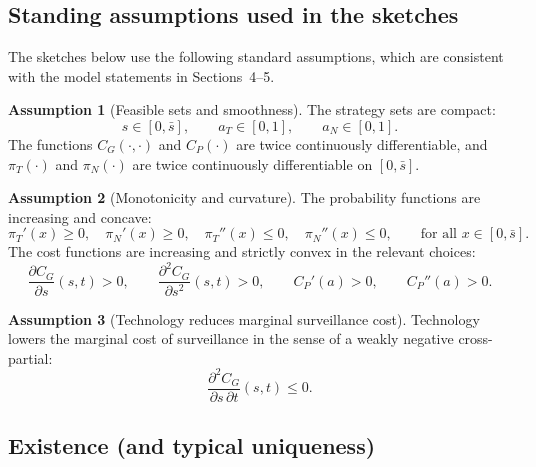 \documentclass[11pt,a4paper]{article}
\theoremstyle{definition}
\theoremstyle{remark}
\theoremstyle{definition}
\newtheorem{assumption}{Assumption}
\begin{document}
\subsection{Standing assumptions used in the sketches}

The sketches below use the following standard assumptions, which are consistent with the model statements in Sections~4--5.

\begin{assumption}[Feasible sets and smoothness]
The strategy sets are compact:
$$
s \in [0,\bar s],
\qquad
a_T \in [0,1],
\qquad
a_N \in [0,1].
$$
The functions $C_G(\cdot,\cdot)$ and $C_P(\cdot)$ are twice continuously differentiable, and $\pi_T(\cdot)$ and $\pi_N(\cdot)$ are twice continuously differentiable on $[0,\bar s]$.
\end{assumption}

\begin{assumption}[Monotonicity and curvature]
The probability functions are increasing and concave:
$$
\pi_T'(x) \ge 0,
\quad
\pi_N'(x) \ge 0,
\quad
\pi_T''(x) \le 0,
\quad
\pi_N''(x) \le 0,
\qquad
\text{for all } x \in [0,\bar s].
$$
The cost functions are increasing and strictly convex in the relevant choices:
$$
\frac{\partial C_G}{\partial s}(s,t) > 0,
\qquad
\frac{\partial^2 C_G}{\partial s^2}(s,t) > 0,
\qquad
C_P'(a) > 0,
\qquad
C_P''(a) > 0.
$$
\end{assumption}

\begin{assumption}[Technology reduces marginal surveillance cost]
Technology lowers the marginal cost of surveillance in the sense of a weakly negative cross-partial:
$$
\frac{\partial^2 C_G}{\partial s\,\partial t}(s,t)\le 0.
$$
\end{assumption}

\subsection{Existence (and typical uniqueness)}
\end{document}
